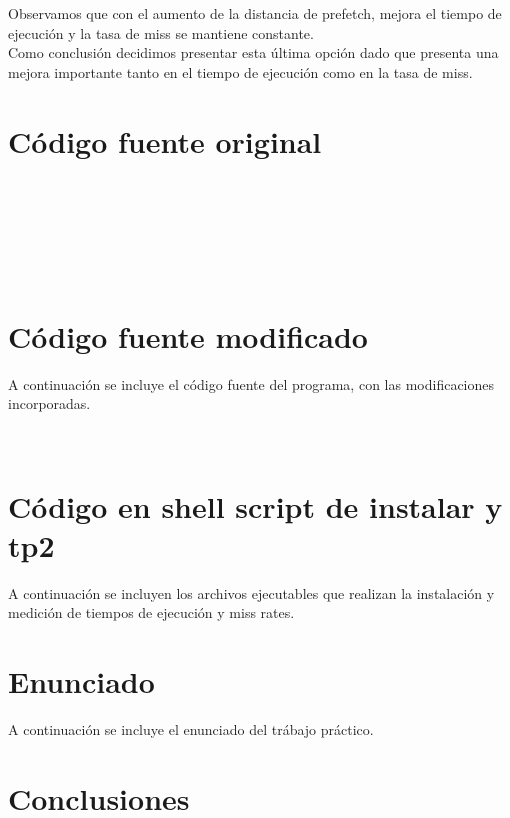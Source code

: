 \documentclass[a4paper,10pt]{article}
\begin{document}
Observamos que con el aumento de la distancia de prefetch, mejora el tiempo de ejecuci\'on y la tasa de miss se mantiene constante.\\

Como conclusi\'on decidimos presentar esta \'ultima opci\'on dado que presenta una mejora importante tanto en el tiempo de ejecuci\'on como en la tasa de miss.











\pagebreak
\section{C\'odigo fuente original} 
\begin{verbatim}


 



\end{verbatim}

\pagebreak
\section{C\'odigo fuente modificado} 

A continuaci\'on se incluye el c\'odigo fuente del programa, con las modificaciones incorporadas.

\begin{verbatim}


\end{verbatim}



\pagebreak

\section{C\'odigo en shell script de instalar y tp2} 

A continuaci\'on se incluyen los  archivos ejecutables que realizan la instalaci\'on y medici\'on de tiempos de ejecuci\'on y miss rates.
\pagebreak


\section{Enunciado} 

A continuaci\'on se incluye el enunciado del tr\'abajo pr\'actico.
\pagebreak

\section{Conclusiones}
\end{document}
